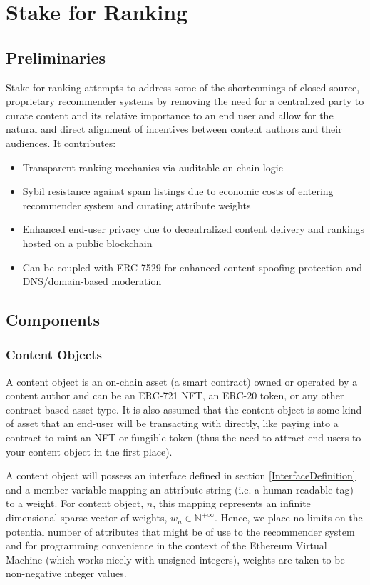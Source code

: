 \section{Stake for Ranking} 
\label{section:ProtocolDescription}

\subsection{Preliminaries}
Stake for ranking attempts to address some of the shortcomings of closed-source, proprietary recommender systems by removing the need for a centralized party to curate content and its relative importance to an end user and allow for the natural and direct alignment of incentives between content authors and their audiences. It contributes:
\begin{itemize}
    \item Transparent ranking mechanics via auditable on-chain logic
    \item Sybil resistance against spam listings due to economic costs of entering recommender system and curating attribute weights
    \item Enhanced end-user privacy due to decentralized content delivery and rankings hosted on a public blockchain
    \item Can be coupled with ERC-7529 \cite{chapman2023erc7529} for enhanced content spoofing protection and DNS/domain-based moderation
\end{itemize}

\subsection{Components}
\subsubsection{Content Objects}
\label{ContentObjectDefinition}

A content object is an on-chain asset (a smart contract) owned or operated by a content author and can be an ERC-721 NFT, an ERC-20 token, or any other contract-based asset type. It is also assumed that the content object is some kind of asset that an end-user will be transacting with directly, like paying into a contract to mint an NFT or fungible token (thus the need to attract end users to your content object in the first place). 

A content object will possess an interface defined in section \ref{InterfaceDefinition} and a member variable mapping an attribute string (i.e. a human-readable tag) to a weight. For content object, $n$, this mapping represents an infinite dimensional sparse vector of weights, $w_n \in \mathbb{N}^{+\infty}$. Hence, we place no limits on the potential number of attributes that might be of use to the recommender system and for programming convenience in the context of the Ethereum Virtual Machine \cite{wood2014ethereum} (which works nicely with unsigned integers), weights are taken to be non-negative integer values. 

